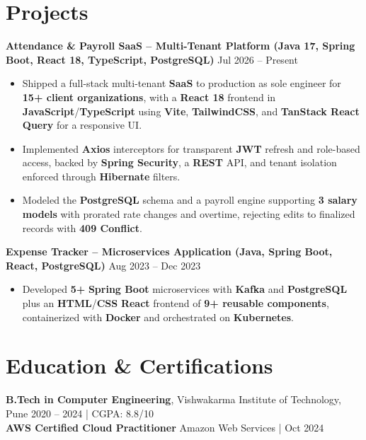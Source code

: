 \documentclass[a4paper,10pt]{article}
\begin{document}
\section*{Projects}

\textbf{Attendance \& Payroll SaaS -- Multi-Tenant Platform (Java 17, Spring Boot, React 18, TypeScript, PostgreSQL)} \hfill Jul 2026 -- Present
\begin{itemize}[leftmargin=*]
    \item Shipped a full-stack multi-tenant \textbf{SaaS} to production as sole engineer for \textbf{15+ client organizations}, with a \textbf{React 18} frontend in \textbf{JavaScript}/\textbf{TypeScript} using \textbf{Vite}, \textbf{TailwindCSS}, and \textbf{TanStack React Query} for a responsive UI.
    \item Implemented \textbf{Axios} interceptors for transparent \textbf{JWT} refresh and role-based access, backed by \textbf{Spring Security}, a \textbf{REST} API, and tenant isolation enforced through \textbf{Hibernate} filters.
    \item Modeled the \textbf{PostgreSQL} schema and a payroll engine supporting \textbf{3 salary models} with prorated rate changes and overtime, rejecting edits to finalized records with \textbf{409 Conflict}.
\end{itemize}

\textbf{Expense Tracker -- Microservices Application (Java, Spring Boot, React, PostgreSQL)} \hfill Aug 2023 -- Dec 2023
\begin{itemize}[leftmargin=*]
    \item Developed \textbf{5+} \textbf{Spring Boot} microservices with \textbf{Kafka} and \textbf{PostgreSQL} plus an \textbf{HTML}/\textbf{CSS} \textbf{React} frontend of \textbf{9+ reusable components}, containerized with \textbf{Docker} and orchestrated on \textbf{Kubernetes}.
\end{itemize}

\section*{Education \& Certifications}
\textbf{B.Tech in Computer Engineering}, Vishwakarma Institute of Technology, Pune \hfill 2020 -- 2024 \;|\; CGPA: 8.8/10 \\
\textbf{AWS Certified Cloud Practitioner} \hfill Amazon Web Services \;|\; Oct 2024
\end{document}
